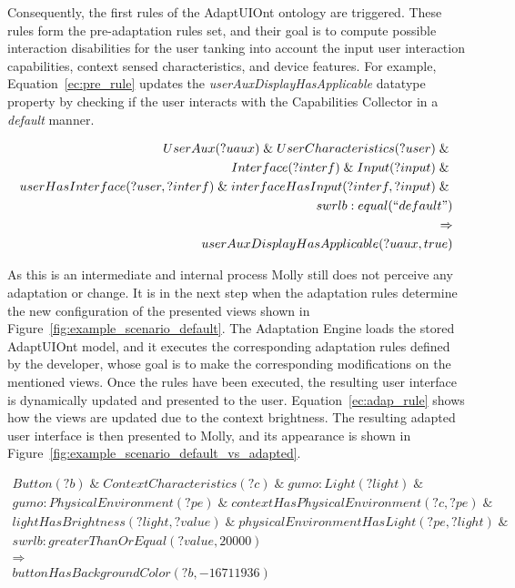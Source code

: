 Consequently, the first rules of the AdaptUIOnt ontology are triggered. These 
rules form the pre-adaptation rules set, and their goal is to compute possible 
interaction disabilities for the user tanking into account the input user 
interaction capabilities, context sensed characteristics, and device features. 
For example, Equation~\ref{ec:pre_rule} updates the 
\textit{userAuxDisplayHasApplicable} datatype property by checking if the user 
interacts with the Capabilities Collector in a \textit{default} manner.
    
\footnotesize
\begin{equation} \label{ec:pre_rule} 
\begin{align*} 
UserAux(?uaux) \; \&\; UserCharacteristics(?user) \; \&\; \\
Interface(?interf) \; \&\; Input(?input) \; \&\; \\
userHasInterface(?user, ?interf) \; \&\; interfaceHasInput(?interf, ?input) \; \&\;\\
swrlb:equal(``default") \\    
\Rightarrow \\
userAuxDisplayHasApplicable(?uaux, true)
\end{align*}
\end{equation}
\normalsize

As this is an intermediate and internal process Molly still does not perceive
any adaptation or change. It is in the next step when the adaptation rules
determine the new configuration of the presented views shown in 
Figure~\ref{fig:example_scenario_default}. The Adaptation Engine loads the 
stored AdaptUIOnt model, and it executes the corresponding adaptation rules 
defined by the developer, whose goal is to make the corresponding modifications
on the mentioned views. Once the rules have been executed, the resulting user 
interface is dynamically updated and presented to the user. 
Equation~\ref{ec:adap_rule} shows how the views are updated due to the context 
brightness. The resulting adapted user interface is then presented to Molly, and 
its appearance is shown in Figure~\ref{fig:example_scenario_default_vs_adapted}.

\footnotesize
\begin{equation} \label{ec:adap_rule} 
\begin{align*} 
Button(?b) \; \&\; ContextCharacteristics(?c) \; \&\; gumo:Light(?light) \; \&\; \\  
gumo:PhysicalEnvironment(?pe) \; \&\; contextHasPhysicalEnvironment(?c, ?pe) \; \&\; \\ 
lightHasBrightness(?light, ?value) \; \&\; physicalEnvironmentHasLight(?pe, ?light) \; \&\; \\
swrlb:greaterThanOrEqual(?value, 20000) \\
\Rightarrow \\
buttonHasBackgroundColor(?b, -16711936) %
\end{align*}
\end{equation}
\normalsize

